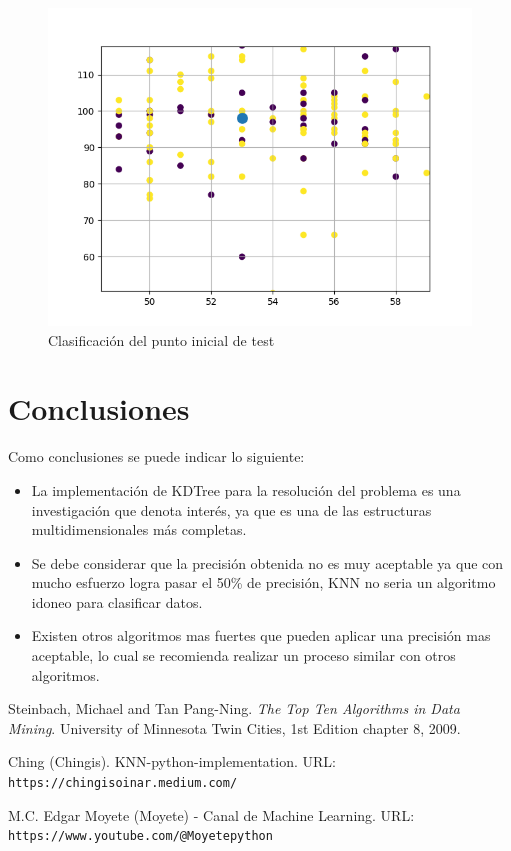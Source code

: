 \documentclass[12pt]{article} %
\begin{document}
\begin{figure}[H]
\centering
\includegraphics[width=\textwidth]{grafica3}
\caption{Clasificación del punto inicial de test}
\end{figure}


\section{Conclusiones}
Como conclusiones se puede indicar lo siguiente:

\begin{itemize}
    \item La implementación de KDTree para la resolución del problema es una investigación que denota interés, ya que es una de las estructuras multidimensionales más completas.
    \item Se debe considerar que la precisión obtenida no es muy aceptable ya que con mucho esfuerzo logra pasar el 50\% de precisión, KNN no seria un algoritmo idoneo para clasificar datos.
    \item Existen otros algoritmos mas fuertes que pueden aplicar una precisión mas aceptable, lo cual se recomienda realizar un proceso similar con otros algoritmos.
\end{itemize}

\begin{thebibliography}{9}
    Steinbach, Michael and Tan Pang-Ning. \textit{The Top Ten Algorithms in Data Mining}. University of Minnesota Twin Cities, 1st Edition chapter 8, 2009.

    Ching (Chingis). KNN-python-implementation. URL: \texttt{https://chingisoinar.medium.com/}
    
    M.C. Edgar Moyete (Moyete) - Canal de Machine Learning. URL: \texttt{https://www.youtube.com/@Moyetepython}

\end{thebibliography}
\end{document}
